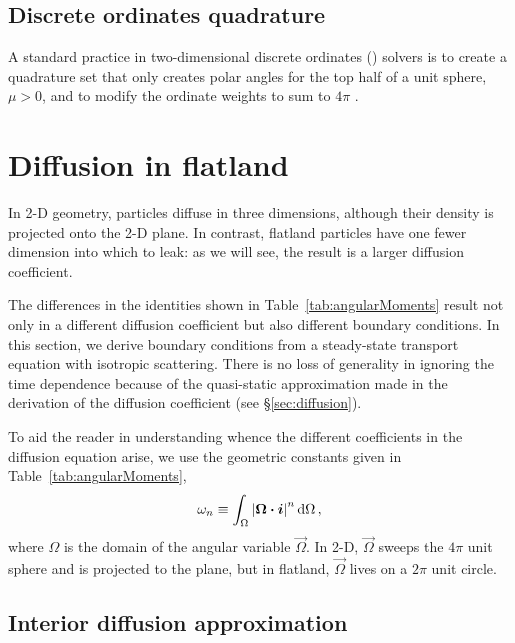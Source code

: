 \subsection{Discrete ordinates quadrature}

A standard practice in two-dimensional discrete ordinates (\SN)
solvers is to create a quadrature set that only creates polar
angles for the top half of a unit sphere, $\mu>0$, and to modify
the ordinate weights to sum to $4\pi$ \cite{Zik1997}.

\section{Diffusion in flatland}

In 2-D geometry, particles diffuse in three dimensions, although their density
is projected onto the 2-D plane. In contrast, flatland particles have one fewer
dimension into which to leak: as we will see, the result is a larger diffusion
coefficient.

The differences in the identities shown in Table~\ref{tab:angularMoments}
result not
only in a different diffusion coefficient but also different boundary
conditions. In this section, we derive boundary conditions from a steady-state
transport equation with isotropic scattering. There is no loss of generality in
ignoring the time dependence because of the quasi-static approximation made in
the derivation of the diffusion coefficient (see \S\ref{sec:diffusion}).

To aid the reader in understanding whence the different coefficients in the
diffusion equation arise, we use the geometric constants given in
Table~\ref{tab:angularMoments},
\begin{equation*}
  \omega_n \equiv \int_\Omega \left| \bm{\Omega} \bm{\cdot} \bm{i} \right|^n \mathop{}\!\mathrm{d} \Omega\,,
\end{equation*}
where $\Omega$ is the domain of the angular variable $\vec{\Omega}$. In 2-D,
$\vec{\Omega}$ sweeps the $4\pi$ unit sphere and is projected to the plane, but
in flatland, $\vec{\Omega}$ lives on a $2\pi$ unit circle.

\subsection{Interior diffusion approximation}

